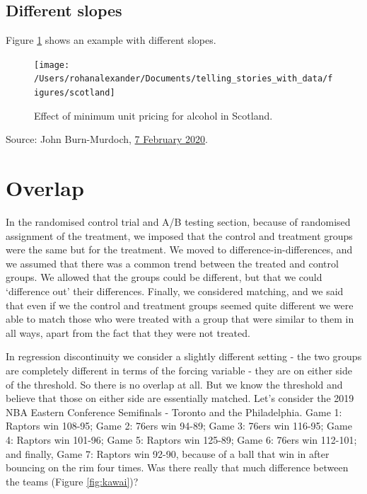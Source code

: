 \documentclass[
]{book}
\begin{document}
\hypertarget{different-slopes}{%
\subsection{Different slopes}\label{different-slopes}}

Figure \ref{fig:scotland} shows an example with different slopes.

\begin{figure}
\texttt{[image: /Users/rohanalexander/Documents/telling\_stories\_with\_data/figures/scotland]} \caption{Effect of minimum unit pricing for alcohol in Scotland.}\label{fig:scotland}
\end{figure}

Source: John Burn-Murdoch, \href{https://twitter.com/jburnmurdoch/status/1225773931342303233}{7 February 2020}.

\hypertarget{overlap}{%
\section{Overlap}\label{overlap}}

In the randomised control trial and A/B testing section, because of randomised assignment of the treatment, we imposed that the control and treatment groups were the same but for the treatment. We moved to difference-in-differences, and we assumed that there was a common trend between the treated and control groups. We allowed that the groups could be different, but that we could `difference out' their differences. Finally, we considered matching, and we said that even if we the control and treatment groups seemed quite different we were able to match those who were treated with a group that were similar to them in all ways, apart from the fact that they were not treated.

In regression discontinuity we consider a slightly different setting - the two groups are completely different in terms of the forcing variable - they are on either side of the threshold. So there is no overlap at all. But we know the threshold and believe that those on either side are essentially matched. Let's consider the 2019 NBA Eastern Conference Semifinals - Toronto and the Philadelphia. Game 1: Raptors win 108-95; Game 2: 76ers win 94-89; Game 3: 76ers win 116-95; Game 4: Raptors win 101-96; Game 5: Raptors win 125-89; Game 6: 76ers win 112-101; and finally, Game 7: Raptors win 92-90, because of a ball that win in after bouncing on the rim four times. Was there really that much difference between the teams (Figure \ref{fig:kawai})?
\end{document}
